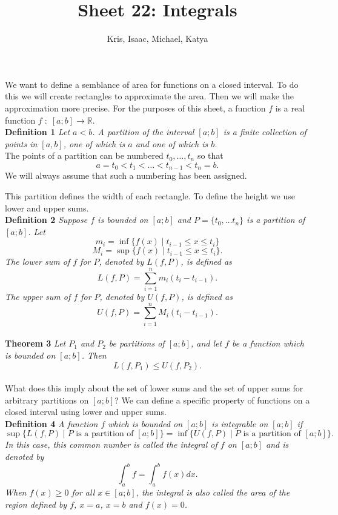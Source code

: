\documentclass{article}
\begin{document}
\author{Kris, Isaac, Michael, Katya}
\title{Sheet 22: Integrals}
\date{}
\maketitle

We want to define a semblance of area for functions on a closed interval. To do this we will create rectangles to approximate the area. Then we will make the approximation more precise. For the purposes of this sheet, a function $f$ is a real function $f \; : \; [a;b] \rightarrow \mathbb{R}$.\\

\noindent \textbf{Definition 1}
\textit{Let $a<b$. A \emph{partition} of the interval $[a;b]$ is a finite collection of points in $[a,b]$, one of which is $a$ and one of which is $b$.}\\

The points of a partition can be numbered $t_0, \dots ,t_n$ so that
\[
a=t_0 < t_1 < \dots < t_{n-1} < t_n = b.
\]
We will always assume that such a numbering has been assigned.

This partition defines the width of each rectangle. To define the height we use lower and upper sums.\\

\noindent \textbf{Definition 2}
\textit{Suppose $f$ is bounded on $[a;b]$ and $P=\{t_0, \dots t_n\}$ is a partition of $[a;b]$. Let
\[
m_i = \inf \{f(x) \mid t_{i-1} \leq x \leq t_i\}
\]
\[
M_i = \sup \{f(x) \mid t_{i-1} \leq x \leq t_i\}.
\]
The \emph{lower sum} of $f$ for $P$, denoted by $L(f,P)$, is defined as
\[
L(f,P) = \sum_{i=1}^n m_i (t_i - t_{i-1}).
\]
The \emph{upper sum} of $f$ for $P$, denoted by $U(f,P)$, is defined as
\[
U(f,P) = \sum_{i=1}^n M_i (t_i - t_{i-1}).
\]}\\

\noindent \textbf{Theorem 3}
\textit{Let $P_1$ and $P_2$ be partitions of $[a;b]$, and let $f$ be a function which is bounded on $[a;b]$. Then
\[
L(f,P_1) \leq U(f,P_2).
\]}\\

What does this imply about the set of lower sums and the set of upper sums for arbitrary partitions on $[a;b]$? We can define a specific property of functions on a closed interval using lower and upper sums.\\

\noindent \textbf{Definition 4}
\textit{A function $f$ which is bounded on $[a;b]$ is \emph{integrable} on $[a;b]$ if
\[
\sup \{L(f,P) \mid \text{$P$ is a partition of $[a;b]$} \} = \inf \{U(f,P) \mid \text{$P$ is a partition of $[a;b]$} \}.
\]
In this case, this common number is called the \emph{integral} of $f$ on $[a;b]$ and is denoted by
\[
\int_a^b f = \int_a^b f(x) dx.
\]
When $f(x) \geq 0$ for all $x \in [a;b]$, the integral is also called the \emph{area} of the region defined by $f$, $x=a$, $x=b$ and $f(x) = 0$.}\\
\end{document}
